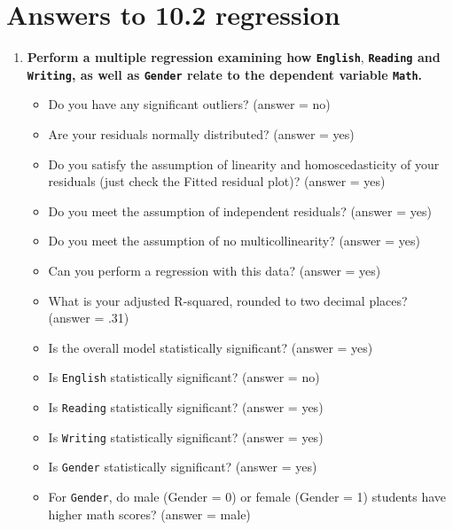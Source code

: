 \documentclass[
]{book}
\begin{document}
\hypertarget{answers-to-10.2-regression}{%
\section{Answers to 10.2 regression}\label{answers-to-10.2-regression}}

\begin{enumerate}
\def\labelenumi{\arabic{enumi}.}
\item
  \textbf{Perform a multiple regression examining how \texttt{English}}, \textbf{\texttt{Reading} and \texttt{Writing}, as well as \texttt{Gender} relate to the dependent variable \texttt{Math}.}

  \begin{itemize}
  \item
    Do you have any significant outliers? (answer = no)
  \item
    Are your residuals normally distributed? (answer = yes)
  \item
    Do you satisfy the assumption of linearity and homoscedasticity of your residuals (just check the Fitted residual plot)? (answer = yes)
  \item
    Do you meet the assumption of independent residuals? (answer = yes)
  \item
    Do you meet the assumption of no multicollinearity? (answer = yes)
  \item
    Can you perform a regression with this data? (answer = yes)
  \item
    What is your adjusted R-squared, rounded to two decimal places? (answer = .31)
  \item
    Is the overall model statistically significant? (answer = yes)
  \item
    Is \texttt{English} statistically significant? (answer = no)
  \item
    Is \texttt{Reading} statistically significant? (answer = yes)
  \item
    Is \texttt{Writing} statistically significant? (answer = yes)
  \item
    Is \texttt{Gender} statistically significant? (answer = yes)
  \item
    For \texttt{Gender}, do male (Gender = 0) or female (Gender = 1) students have higher math scores? (answer = male)
  \end{itemize}
\end{enumerate}

  
\end{document}
